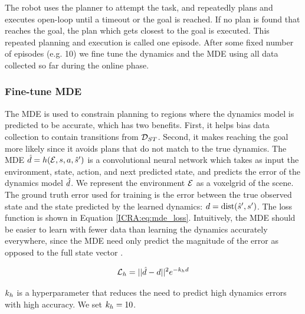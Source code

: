 The robot uses the planner to attempt the task, and repeatedly plans and executes open-loop until a timeout or the goal is reached. If no plan is found that reaches the goal, the plan which gets closest to the goal is executed. This repeated planning and execution is called one episode. After some fixed number of episodes (e.g. 10) we fine tune the dynamics and the MDE using all data collected so far during the online phase.

\subsubsection{Fine-tune MDE}
\label{ICRA:sec:fine_tuning_mde}

The MDE is used to constrain planning to regions where the dynamics model is predicted to be accurate, which has two benefits. First, it helps bias data collection to contain transitions from $\mathcal{D}_{ST}$. Second, it makes reaching the goal more likely since it avoids plans that do not match to the true dynamics. The MDE $\hat{d}=h(\mathcal{E},s,a,\hat{s}')$ is a convolutional neural network which takes as input the environment, state, action, and next predicted state, and predicts the error of the dynamics model $\hat{d}$. We represent the environment $\mathcal{E}$ as a voxelgrid of the scene. The ground truth error used for training is the error between the true observed state and the state predicted by the learned dynamics: $d=\mathrm{dist}(\hat{s}',s')$. The loss function is shown in Equation \eqref{ICRA:eq:mde_loss}. Intuitively, the MDE should be easier to learn with fewer data than learning the dynamics accurately everywhere, since the MDE need only predict the magnitude of the error as opposed to the full state vector \cite{UnreliableMitrano2021}.

\begin{equation}
    \label{ICRA:eq:mde_loss}
    \mathcal{L}_{h} = ||\hat{d} - d||^2e^{-{k_h d}}
\end{equation}

$k_h$ is a hyperparameter that reduces the need to predict high dynamics errors with high accuracy. We set $k_h=10$.
